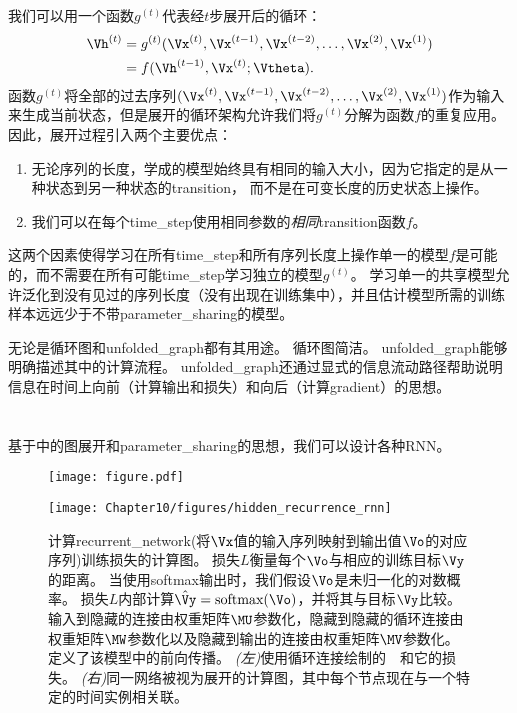我们可以用一个函数$g^{(t)}$代表经$t$步展开后的循环：
\begin{align}
\label{eq:106}
  \Vh^{(t)} &=g^{(t)}(\Vx^{(t)},\Vx^{(t-1)}, \Vx^{(t-2)},\dots,\Vx^{(2)}, \Vx^{(1)}) \\
  & =  f(\Vh^{(t-1)}, \Vx^{(t)} ; \Vtheta) .
\end{align}
函数$g^{(t)}$将全部的过去序列$(\Vx^{(t)},\Vx^{(t-1)}, \Vx^{(t-2)},\dots,\Vx^{(2)}, \Vx^{(1)})$作为输入来生成当前状态，但是展开的循环架构允许我们将$g^{(t)}$分解为函数$f$的重复应用。
因此，展开过程引入两个主要优点：
\begin{enumerate}
 \item 无论序列的长度，学成的模型始终具有相同的输入大小，因为它指定的是从一种状态到另一种状态的\gls{transition}， 而不是在可变长度的历史状态上操作。
 \item 我们可以在每个\gls{time_step}使用相同参数的\emph{相同}\gls{transition}函数$f$。
\end{enumerate}
这两个因素使得学习在所有\gls{time_step}和所有序列长度上操作单一的模型$f$是可能的，而不需要在所有可能\gls{time_step}学习独立的模型$g^{(t)}$。
学习单一的共享模型允许泛化到没有见过的序列长度（没有出现在训练集中），并且估计模型所需的训练样本远远少于不带\gls{parameter_sharing}的模型。


无论是循环图和\gls{unfolded_graph}都有其用途。
循环图简洁。
\gls{unfolded_graph}能够明确描述其中的计算流程。
\gls{unfolded_graph}还通过显式的信息流动路径帮助说明信息在时间上向前（计算输出和损失）和向后（计算\gls{gradient}）的思想。

\section{}
\label{sec:recurrent_neural_networks}
基于中的图展开和\gls{parameter_sharing}的思想，我们可以设计各种\gls{RNN}。
\begin{figure}[!htb]
\ifOpenSource
\centerline{\texttt{[image: figure.pdf]}}
\else
\centerline{\texttt{[image: Chapter10/figures/hidden\_recurrence\_rnn]}}
\fi
\caption{计算\gls{recurrent_network}(将$\Vx$值的输入序列映射到输出值$\Vo$的对应序列)训练损失的计算图。
损失$L$衡量每个$\Vo$与相应的训练目标$\Vy$的距离。
当使用softmax输出时，我们假设$\Vo$是未归一化的对数概率。
损失$L$内部计算$\hat{\Vy} = \text{softmax}(\Vo)$，并将其与目标$\Vy$比较。
输入到隐藏的连接由权重矩阵$\MU$参数化，隐藏到隐藏的循环连接由权重矩阵$\MW$参数化以及隐藏到输出的连接由权重矩阵$\MV$参数化。
定义了该模型中的前向传播。
\emph{(左)}使用循环连接绘制的~~和它的损失。
\emph{(右)}同一网络被视为展开的计算图，其中每个节点现在与一个特定的时间实例相关联。
}
\label{fig:chap10_hidden_recurrence_rnn}
\end{figure}

